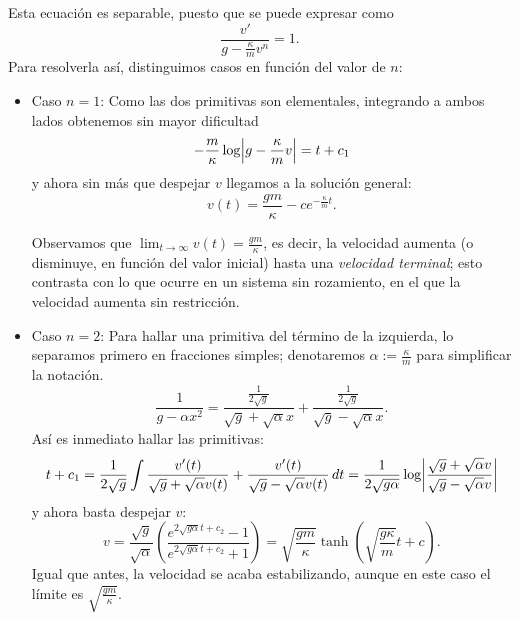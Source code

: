 \documentclass[../ecuaciones_diferenciales.tex]{subfiles}
\begin{document}
\begin{solution}
	Esta ecuación es separable, puesto que se puede expresar como
	\[\frac{v'}{g - \frac{\kappa}{m} v^n} = 1.\]
	Para resolverla así, distinguimos casos en función del valor de \(n\):
	\begin{itemize}
		\item Caso \(n = 1\):
		      Como las dos primitivas son elementales, integrando a ambos lados
		      obtenemos sin mayor dificultad
		      \[-\frac{m}{\kappa} \log \abs{g - \frac{\kappa}{m} v} = t + c_1\]
		      y ahora sin más que despejar \(v\) llegamos a la solución general:
		      \[v(t) = \frac{gm}{\kappa} - ce^{-\frac{\kappa}{m}t}.\]

		      Observamos que \(\lim_{t \to \infty} v(t) = \frac{gm}{\kappa}\), es
		      decir, la velocidad aumenta (o disminuye, en función del valor inicial)
		      hasta una \emph{velocidad terminal}; esto contrasta con lo que ocurre en
		      un sistema sin rozamiento, en el que la velocidad aumenta sin
		      restricción.
		\item Caso \(n = 2\): Para hallar una primitiva del término de la
		      izquierda, lo separamos primero en fracciones simples; denotaremos
		      \(\alpha := \frac{\kappa}{m}\) para simplificar la notación.
		      \[\frac{1}{g - \alpha x^2} = \frac{\frac{1}{2\sqrt{g}}}{\sqrt{g} +
				      \sqrt{\alpha}x} + \frac{\frac{1}{2\sqrt{g}}}{\sqrt{g} -
				      \sqrt{\alpha}x}.\]
		      Así es inmediato hallar las primitivas:
		      \[t + c_1 = \frac{1}{2\sqrt{g}} \int \frac{v'(t)}{\sqrt{g} +
				      \sqrt{\alpha}v(t)} + \frac{v'(t)}{\sqrt{g} - \sqrt{\alpha}v(t)}
			      \dif t = \frac{1}{2\sqrt{g\alpha}} \log \abs{\frac{\sqrt{g} +
					      \sqrt{\alpha}v}{\sqrt{g} - \sqrt{\alpha}v}}\]
		      y ahora basta despejar \(v\):
		      \[v =
			      \frac{\sqrt{g}}{\sqrt{\alpha}}
			      \left(\frac{e^{2\sqrt{g\alpha}t+c_2}-1}
			      {e^{2\sqrt{g\alpha}t+c_2}+1}\right)
			      =
			      \sqrt{\frac{gm}{\kappa}}\tanh
			      \left(\sqrt{\frac{g\kappa}{m}}t+c\right).\]
		      Igual que antes, la velocidad se acaba estabilizando, aunque en este
		      caso el límite es \(\sqrt{\frac{gm}{\kappa}}\).
	\end{itemize}
\end{solution}
\end{document}
